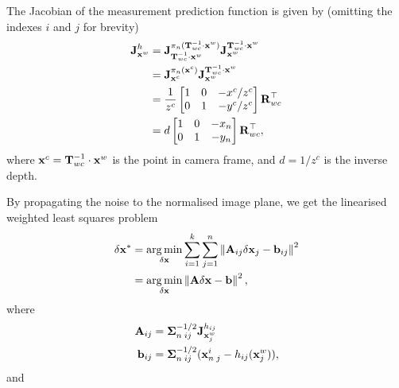 The Jacobian of the measurement prediction function is given by (omitting the indexes $i$ and $j$ for brevity)
\begin{subequations} \label{eq:ba-structure-jacobian}
\begin{align}
  \jac{h}{\vecx^w} &= \jac{\pi_n(\matT_{wc}^{-1} \cdot \vecx^w)}{\matT_{wc}^{-1} \cdot \vecx^w} \jac{\matT_{wc}^{-1} \cdot \vecx^w}{\vecx^w}\\
  &= \jac{\pi_n(\vecx^c)}{\vecx^c}  \jac{\matT_{wc}^{-1} \cdot \vecx^w}{\vecx^w}\\
  &= \frac{1}{z^c}
  \begin{bmatrix}
  1 & 0 & -x^c/z^c\\
  0 & 1 & -y^c/z^c
  \end{bmatrix}
  \matR_{wc}\trans\\
  &= d
  \begin{bmatrix}
  1 & 0 & -x_n\\
  0 & 1 & -y_n
  \end{bmatrix}
  \matR_{wc}\trans,
\end{align}
\end{subequations}
where $\vecx^c = \matT_{wc}^{-1} \cdot \vecx^w$ is the point in camera frame, and $d = 1/z^c$ is the inverse depth.

By propagating the noise to the normalised image plane, we get the linearised weighted least squares problem
\begin{align}
  \delta\vecx^\ast &= \argmin_{\delta\vecx} \sum^k_{i=1} \sum^n_{j=1} \norm{ \matA_{ij} \delta\vecx_j - \vecb_{ij}}^2\\
  &= \argmin_{\delta\vecx} \norm{ \matA \delta\vecx - \vecb}^2,
\end{align}
where
\begin{align}
  \matA_{ij} &= \matSigma^{-1/2}_{n \; {ij}} \jac{h_{ij}}{\vecx^w_j}\\
  \vecb_{ij} &= \matSigma^{-1/2}_{n \; {ij}} (\vecx_{n \; j}^i - h_{ij}(\vecx^w_j)),
\end{align}
and

